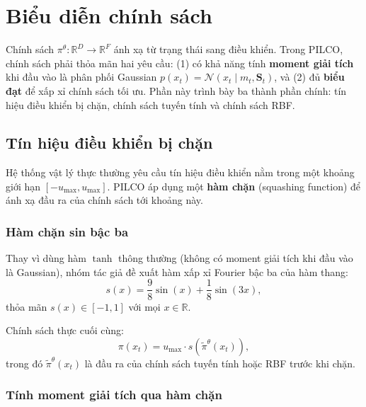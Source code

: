 \section{Biểu diễn chính sách}
\label{SEC_policy}

Chính sách $\pi^\theta: \mathbb{R}^D \to \mathbb{R}^F$ ánh xạ từ trạng thái sang điều khiển. Trong PILCO, chính sách phải thỏa mãn hai yêu cầu: (1) có khả năng tính \textbf{moment giải tích} khi đầu vào là phân phối Gaussian $p(x_t) = \mathcal{N}(x_t \mid m_t, \mathbf{S}_t)$, và (2) đủ \textbf{biểu đạt} để xấp xỉ chính sách tối ưu. Phần này trình bày ba thành phần chính: tín hiệu điều khiển bị chặn, chính sách tuyến tính và chính sách RBF.

\subsection{Tín hiệu điều khiển bị chặn}
\label{SUB_SEC_squashing}

Hệ thống vật lý thực thường yêu cầu tín hiệu điều khiển nằm trong một khoảng giới hạn $[-u_{\max}, u_{\max}]$. PILCO áp dụng một \textbf{hàm chặn} (squashing function) để ánh xạ đầu ra của chính sách tới khoảng này.

\subsubsection{Hàm chặn sin bậc ba}
\label{SUB_SUB_SEC_squashing_function}

Thay vì dùng hàm $\tanh$ thông thường (không có moment giải tích khi đầu vào là Gaussian), nhóm tác giả đề xuất hàm xấp xỉ Fourier bậc ba của hàm thang:
\begin{equation}
    s(x) = \frac{9}{8}\sin(x) + \frac{1}{8}\sin(3x),
    \label{squashing_function}
\end{equation}
thỏa mãn $s(x) \in [-1, 1]$ với mọi $x \in \mathbb{R}$.

Chính sách thực cuối cùng:
\begin{equation}
    \pi(x_t) = u_{\max} \cdot s(\tilde{\pi}^\theta(x_t)),
    \label{policy_final}
\end{equation}
trong đó $\tilde{\pi}^\theta(x_t)$ là đầu ra của chính sách tuyến tính hoặc RBF trước khi chặn.

\subsubsection{Tính moment giải tích qua hàm chặn}
\label{SUB_SUB_SEC_squashing_moment}


